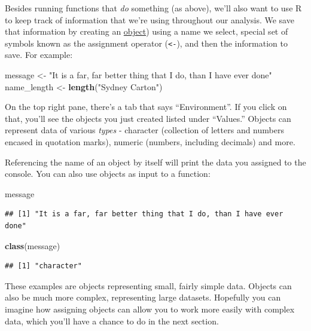 \documentclass[]{Nemilov}
\newenvironment{Shaded}{\begin{snugshade}}{\end{snugshade}}
\newcommand{\KeywordTok}[1]{\textcolor[rgb]{0.13,0.29,0.53}{\textbf{#1}}}
\newcommand{\NormalTok}[1]{#1}
\newcommand{\StringTok}[1]{\textcolor[rgb]{0.31,0.60,0.02}{#1}}
\begin{document}
Besides running functions that \emph{do} something (as above), we'll also want
to use R to keep track of information that we're using throughout
our analysis. We save that information by creating an
\href{glossary.html\#object}{object})
using a name we select, special set of symbols known as the
assignment operator (\texttt{\textless{}-}), and then the information to save.
For example:

\begin{Shaded}
\begin{Highlighting}[]
\NormalTok{message <-}\StringTok{ "It is a far, far better thing that I do, than I have ever done"}
\NormalTok{name_length <-}\StringTok{ }\KeywordTok{length}\NormalTok{(}\StringTok{"Sydney Carton"}\NormalTok{)}
\end{Highlighting}
\end{Shaded}

On the top right pane, there's a
tab that says ``Environment''. If you click on that, you'll see the
objects you just created listed under ``Values.'' Objects can represent data of
various \emph{types} - character (collection of letters and numbers encased in
quotation marks), numeric (numbers, including decimals) and more.

Referencing the name of an object by itself will print the data you assigned
to the console. You can also use objects as input to a function:

\begin{Shaded}
\begin{Highlighting}[]
\NormalTok{message}
\end{Highlighting}
\end{Shaded}

\begin{verbatim}
## [1] "It is a far, far better thing that I do, than I have ever done"
\end{verbatim}

\begin{Shaded}
\begin{Highlighting}[]
\KeywordTok{class}\NormalTok{(message)}
\end{Highlighting}
\end{Shaded}

\begin{verbatim}
## [1] "character"
\end{verbatim}

These examples are objects representing small, fairly simple data.
Objects can also be much more complex, representing large datasets.
Hopefully you can imagine how assigning objects can allow you to
work more easily with complex data, which you'll have a chance to do
in the next section.
\end{document}

